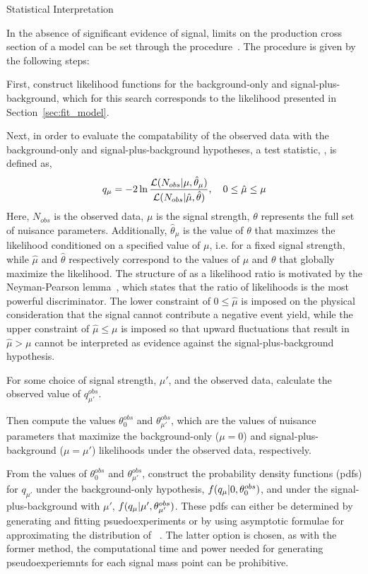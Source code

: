 \begin{section}{Statistical Interpretation}

In the absence of significant evidence of signal, limits on the production cross section of a model can be set through the \CLs procedure~\cite{0954-3899-28-10-313,CMS-NOTE-2011-005,Junk:1999kv}.
The procedure is given by the following steps:

First, construct likelihood functions for the background-only and signal-plus-background, which for this search corresponds to the likelihood presented in Section~\ref{sec:fit_model}.

Next, in order to evaluate the compatability of the observed data with the background-only and signal-plus-background hypotheses, a test statistic, \qu, is defined as,
\begin{align}
q_{\mu} = -2\ln \frac{\mathcal{L}(N_{obs}|\mu,\hat{\theta}_{\mu})}{\mathcal{L}(N_{obs}|\hat{\mu},\hat{\theta})}, \quad  0 \leq \hat{\mu} \leq \mu
\end{align}
Here, $N_{obs}$ is the observed data, $\mu$ is the signal strength, $\theta$ represents the full set of nuisance parameters.
Additionally, $\hat{\theta}_{\mu}$ is the value of $\theta$ that maximzes the likelihood conditioned on a specified value of $\mu$, i.e. for a fixed signal strength, while $\hat{\mu}$ and $\hat{\theta}$ respectively correspond to the values of $\mu$ and $\theta$ that globally maximize the likelihood.
The structure of \qu as a likelihood ratio is motivated by the Neyman-Pearson lemma~\cite{Neyman289}, which states that the ratio of likelihoods is the most powerful discriminator.
The lower constraint of $0 \leq \hat{\mu}$ is imposed on the physical consideration that the signal cannot contribute a negative event yield, while the upper constraint of $\hat{\mu} \leq \mu$ is imposed so that upward fluctuations that result in $\hat{\mu} > \mu$ cannot be interpreted as evidence against the signal-plus-background hypothesis.

For some choice of signal strength, $\mu'$, and the observed data, calculate the observed value of $q^{obs}_{\mu'}$.

Then compute the values $\theta^{obs}_{0}$ and $\theta^{obs}_{\mu'}$, which are the values of nuisance parameters that maximize the background-only ($\mu = 0$) and signal-plus-background ($\mu = \mu'$) likelihoods under the observed data, respectively.

From the values of $\theta^{obs}_{0}$ and $\theta^{obs}_{\mu'}$, construct the probability density functions (pdfs) for $q_{\mu'}$ under the background-only hypothesis, $f(q_{\mu}|0,\theta^{obs}_{0})$, and under the signal-plus-background with $\mu'$, $f(q_{\mu}|\mu',\theta^{obs}_{\mu'})$.
These pdfs can either be determined by generating and fitting psuedoexperiments or by using asymptotic formulae for approximating the distribution of \qu~\cite{Cowan:2010js}.
The latter option is chosen, as with the former method, the computational time and power needed for generating pseudoexperiemnts for each signal mass point can be prohibitive.


\end{section}
